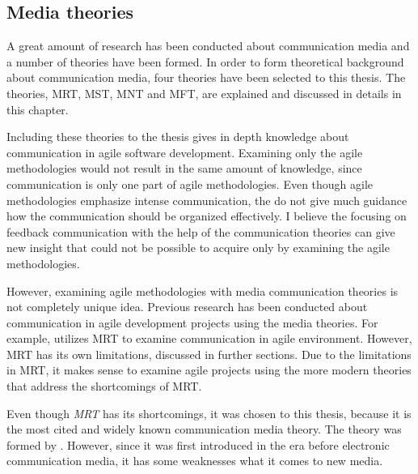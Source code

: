 \documentclass[english,12pt,a4paper,pdftex]{article}
\begin{document}
\subsection{Media theories}

A great amount of research has been conducted about communication media and a number of theories have been formed. In order to form theoretical background about communication media, four theories have been selected to this thesis. The theories, \acl{MRT}, \acl{MST}, \acl{MNT} and \acl{MFT}, are explained and discussed in details in this chapter.

Including these theories to the thesis gives in depth knowledge about communication in agile software development. Examining only the agile methodologies would not result in the same amount of knowledge, since communication is only one part of agile methodologies. Even though agile methodologies emphasize intense communication, the do not give much guidance how the communication should be organized effectively. I believe the focusing on feedback communication with the help of the communication theories can give new insight that could not be possible to acquire only by examining the agile methodologies.

However, examining agile methodologies with media communication theories is not completely unique idea. Previous research has been conducted about communication in agile development projects using the media theories. For example, \citet{korkala2006} utilizes \ac{MRT} to examine communication in agile environment. However, \ac{MRT} has its own limitations, discussed in further sections. Due to the limitations in \ac{MRT}, it makes sense to examine agile projects using the more modern theories that address the shortcomings of \ac{MRT}.

Even though \emph{\acl{MRT}} has its shortcomings, it was chosen to this thesis, because it is the most cited and widely known communication media theory. The theory was formed by \citet{daft1986}. However, since it was first introduced in the era before electronic communication media, it has some weaknesses what it comes to new media.
\end{document}
